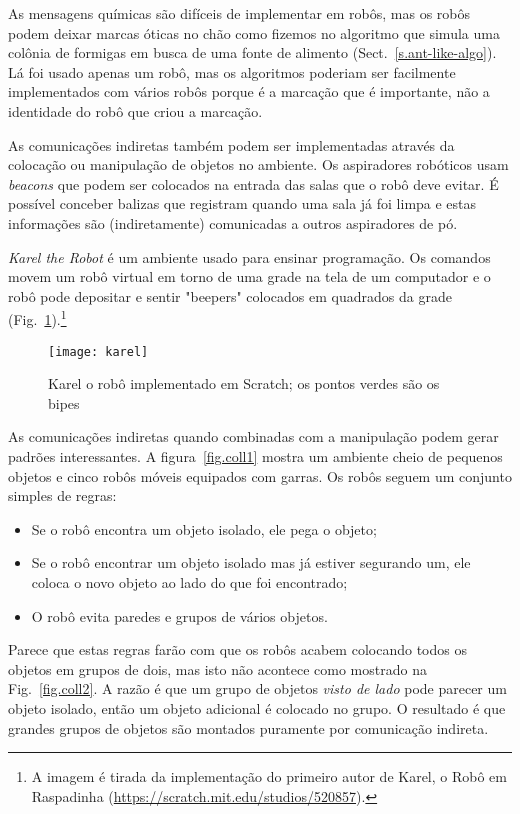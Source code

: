 As mensagens químicas são difíceis de implementar em robôs, mas os robôs podem deixar marcas óticas no chão como fizemos no algoritmo que simula uma colônia de formigas em busca de uma fonte de alimento (Sect.~\ref{s.ant-like-algo}). Lá foi usado apenas um robô, mas os algoritmos poderiam ser facilmente implementados com vários robôs porque é a marcação que é importante, não a identidade do robô que criou a marcação.

As comunicações indiretas também podem ser implementadas através da colocação ou manipulação de objetos no ambiente. Os aspiradores robóticos usam \emph{beacons} que podem ser colocados na entrada das salas que o robô deve evitar. É possível conceber balizas que registram quando uma sala já foi limpa e estas informações são (indiretamente) comunicadas a outros aspiradores de pó.

\emph{Karel the Robot} é um ambiente usado para ensinar programação. Os comandos movem um robô virtual em torno de uma grade na tela de um computador e o robô pode depositar e sentir "beepers" colocados em quadrados da grade (Fig.~\ref{fig.karel}).\footnote{A imagem é tirada da implementação do primeiro autor de Karel, o Robô em Raspadinha (\url{https://scratch.mit.edu/studios/520857}).}

\begin{figure}
\begin{center}
\texttt{[image: karel]}
\end{center}
\caption{Karel o robô implementado em Scratch; os pontos verdes são os bipes}\label{fig.karel}
\end{figure}

As comunicações indiretas quando combinadas com a manipulação podem gerar padrões interessantes. A figura~\ref{fig.coll1} mostra um ambiente cheio de pequenos objetos e cinco robôs móveis equipados com garras. Os robôs seguem um conjunto simples de regras:
\begin{itemize}
\item Se o robô encontra um objeto isolado, ele pega o objeto;
\item Se o robô encontrar um objeto isolado mas já estiver segurando um, ele coloca o novo objeto ao lado do que foi encontrado;
\item O robô evita paredes e grupos de vários objetos.
\end{itemize}
Parece que estas regras farão com que os robôs acabem colocando todos os objetos em grupos de dois, mas isto não acontece como mostrado na Fig.~\ref{fig.coll2}. A razão é que um grupo de objetos \emph{visto de lado} pode parecer um objeto isolado, então um objeto adicional é colocado no grupo. O resultado é que grandes grupos de objetos são montados puramente por comunicação indireta.

